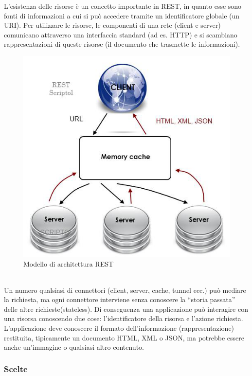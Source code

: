 L'esistenza delle risorse è un concetto importante in REST, in quanto esse sono fonti di informazioni a cui si può accedere tramite un identificatore globale (un URI). Per utilizzare le risorse, le componenti di una rete (client e server) comunicano attraverso una interfaccia standard (ad es. HTTP) e si scambiano rappresentazioni di queste risorse (il documento che trasmette le informazioni).
\\
\begin{figure}[h!]
\begin{center}
\includegraphics[scale=0.7]{imgs/rest_architecture.png} 
\caption{Modello di architettura REST\label{restimage}}
\end{center}
\end{figure}
\\
Un numero qualsiasi di connettori (client, server, cache, tunnel ecc.) può mediare la richiesta, ma ogni connettore interviene senza conoscere la “storia passata” delle altre richieste(stateless). Di conseguenza una applicazione può interagire con una risorsa conoscendo due cose: l'identificatore della risorsa e l'azione richiesta.
L'applicazione deve conoscere il formato dell'informazione (rappresentazione) restituita, tipicamente un documento HTML, XML o JSON, ma potrebbe essere anche un'immagine o qualsiasi altro contenuto.

\subsubsection{Scelte}

